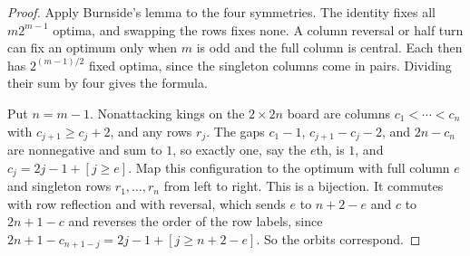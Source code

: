 \begin{proof}
Apply Burnside's lemma to the four symmetries. The identity fixes all
$m2^{m-1}$ optima, and swapping the rows fixes none. A column reversal or
half turn can fix an optimum only when $m$ is odd and the full column is
central. Each then has $2^{(m-1)/2}$ fixed optima, since the singleton
columns come in pairs. Dividing their sum by four gives the formula.

Put $n=m-1$. Nonattacking kings on the $2\times2n$ board are columns $c_1<\cdots<c_n$ with
$c_{j+1}\ge c_j+2$, and any rows $r_j$. The gaps $c_1-1$, $c_{j+1}-c_j-2$, and $2n-c_n$
are nonnegative and sum to $1$, so exactly one, say the $e$th, is $1$, and
$c_j=2j-1+[j\ge e]$. Map this configuration to the optimum with full column $e$ and singleton
rows $r_1,\ldots,r_n$ from left to right. This is a bijection. It commutes with row
reflection and with reversal, which sends $e$ to
$n+2-e$ and $c$ to $2n+1-c$ and reverses the order of the row labels, since $2n+1-c_{n+1-j}=2j-1+[j\ge n+2-e]$.
So the orbits correspond.
\end{proof}
